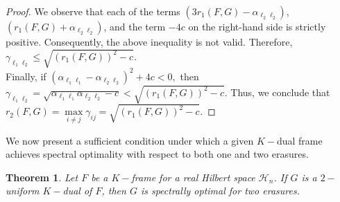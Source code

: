 \documentclass[final,1p,times]{elsarticle}
\newtheorem{thm}{Theorem}[section]
\begin{document}
\begin{proof}
		We observe that each of the terms \( \left(3r_{1}(F,G) - \alpha_{\ell_2 \ell_2} \right) \), \( \left(r_{1}(F,G) + \alpha_{\ell_2 \ell_2} \right) \), and the term \( -4c \) on the right-hand side is strictly positive. Consequently, the above inequality is not valid. Therefore,  $\gamma_{ \ell_1 \ell_2 } \leq \sqrt{\left(r_{1} (F,G)\right)^2-c}.$\\
		Finally, if  $\left(  \alpha_{\ell_1 \ell_1} - \alpha_{\ell_2 \ell_2} \right)^2 + 4c < 0,$ then $ \gamma_{\ell_1 \ell_2} =\sqrt{ \alpha_{\ell_1 \ell_1} \alpha_{\ell_2 \ell_2} -c}< \sqrt{\left(r_{1} (F,G)\right)^2-c}.$ Thus, we conclude that $	r_{2} (F,G) =\max\limits_{i \neq j} \gamma_{ij} =  \sqrt{\left(r_{1} (F,G)\right)^2-c}.$
		
		
	\end{proof}
	
	
	
	We now present a sufficient condition under which a given $K-$dual frame achieves spectral optimality with respect to both one and two erasures.

\begin{thm}
Let \( F \) be a \( K-\)frame for a real Hilbert space \( \mathcal{H}_n \). If \( G \) is a \( 2-\)uniform \( K-\)dual of \( F \), then \( G \) is spectrally optimal for two erasures.
\end{thm}
\end{document}

